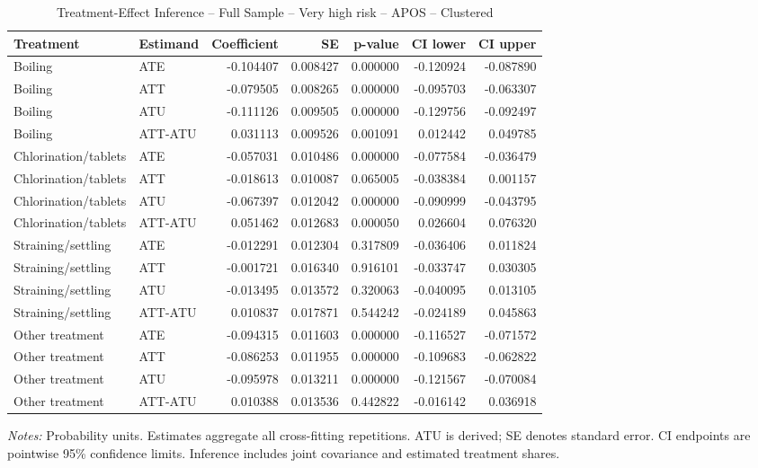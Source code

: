 \begin{table}[htbp]
\centering
\caption{Treatment-Effect Inference -- Full Sample -- Very high risk -- APOS -- Clustered}
\label{tab:inference-VeryHighRiskHome-APOS}
\scriptsize
\begin{adjustbox}{max width=\linewidth}
\begin{tabular}{llrrrrr}
\toprule
Treatment & Estimand & Coefficient & SE & p-value & CI lower & CI upper \\
\midrule
Boiling & ATE & -0.104407 & 0.008427 & 0.000000 & -0.120924 & -0.087890 \\
Boiling & ATT & -0.079505 & 0.008265 & 0.000000 & -0.095703 & -0.063307 \\
Boiling & ATU & -0.111126 & 0.009505 & 0.000000 & -0.129756 & -0.092497 \\
Boiling & ATT-ATU & 0.031113 & 0.009526 & 0.001091 & 0.012442 & 0.049785 \\
Chlorination/tablets & ATE & -0.057031 & 0.010486 & 0.000000 & -0.077584 & -0.036479 \\
Chlorination/tablets & ATT & -0.018613 & 0.010087 & 0.065005 & -0.038384 & 0.001157 \\
Chlorination/tablets & ATU & -0.067397 & 0.012042 & 0.000000 & -0.090999 & -0.043795 \\
Chlorination/tablets & ATT-ATU & 0.051462 & 0.012683 & 0.000050 & 0.026604 & 0.076320 \\
Straining/settling & ATE & -0.012291 & 0.012304 & 0.317809 & -0.036406 & 0.011824 \\
Straining/settling & ATT & -0.001721 & 0.016340 & 0.916101 & -0.033747 & 0.030305 \\
Straining/settling & ATU & -0.013495 & 0.013572 & 0.320063 & -0.040095 & 0.013105 \\
Straining/settling & ATT-ATU & 0.010837 & 0.017871 & 0.544242 & -0.024189 & 0.045863 \\
Other treatment & ATE & -0.094315 & 0.011603 & 0.000000 & -0.116527 & -0.071572 \\
Other treatment & ATT & -0.086253 & 0.011955 & 0.000000 & -0.109683 & -0.062822 \\
Other treatment & ATU & -0.095978 & 0.013211 & 0.000000 & -0.121567 & -0.070084 \\
Other treatment & ATT-ATU & 0.010388 & 0.013536 & 0.442822 & -0.016142 & 0.036918 \\
\bottomrule
\end{tabular}

\end{adjustbox}
\par\smallskip
\begin{minipage}{\linewidth}\scriptsize \textit{Notes:} Probability units. Estimates aggregate all cross-fitting repetitions. ATU is derived; SE denotes standard error. CI endpoints are pointwise 95\% confidence limits. Inference includes joint covariance and estimated treatment shares. \end{minipage}
\end{table}

